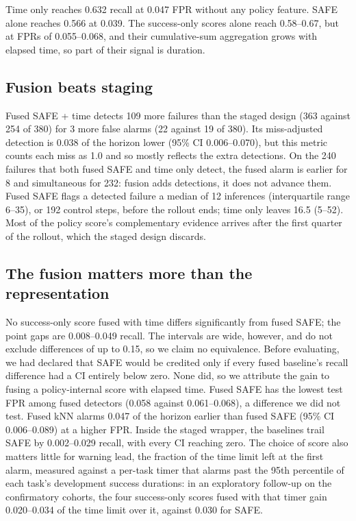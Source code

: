 \documentclass[conference,a4paper]{IEEEtran}
\begin{document}
Time only reaches 0.632 recall at 0.047 FPR without any policy feature. SAFE alone reaches
0.566 at 0.039. The success-only scores alone reach 0.58--0.67, but at FPRs of 0.055--0.068,
and their cumulative-sum aggregation grows with elapsed time, so part of their signal is
duration.

\subsection{Fusion beats staging}

Fused SAFE + time detects 109 more failures than the staged design (363 against 254 of 380)
for 3 more false alarms (22 against 19 of 380). Its miss-adjusted detection is 0.038 of the
horizon lower (95\% CI 0.006--0.070), but this metric counts each miss as 1.0 and so mostly
reflects the extra detections. On the 240 failures that both fused SAFE and time only
detect, the fused alarm is earlier for 8 and simultaneous for 232: fusion adds detections,
it does not advance them. Fused SAFE flags a detected failure a median of 12 inferences
(interquartile range 6--35), or 192 control steps, before the rollout ends; time only
leaves 16.5 (5--52). Most of the policy score's complementary evidence arrives after the
first quarter of the rollout, which the staged design discards.

\subsection{The fusion matters more than the representation}

No success-only score fused with time differs significantly from fused SAFE; the point gaps
are 0.008--0.049 recall. The intervals are wide, however, and do not exclude differences of
up to 0.15, so we claim no equivalence. Before evaluating, we had declared that SAFE would be
credited only if every fused baseline's recall difference had a CI entirely below zero.
None did, so we attribute the gain to fusing a policy-internal score with elapsed time.
Fused SAFE has the lowest test FPR among fused detectors (0.058 against 0.061--0.068), a
difference we did not test. Fused kNN alarms 0.047 of the horizon earlier than fused SAFE
(95\% CI 0.006--0.089) at a higher FPR. Inside the staged wrapper, the baselines trail SAFE
by 0.002--0.029 recall, with every CI reaching zero. The choice of score also matters little for warning lead, the
fraction of the time limit left at the first alarm, measured against a per-task timer that
alarms past the 95th percentile of each task's development success durations: in an
exploratory follow-up on the confirmatory cohorts, the four success-only scores fused with
that timer gain 0.020--0.034 of the time limit over it, against 0.030 for SAFE.
\end{document}
